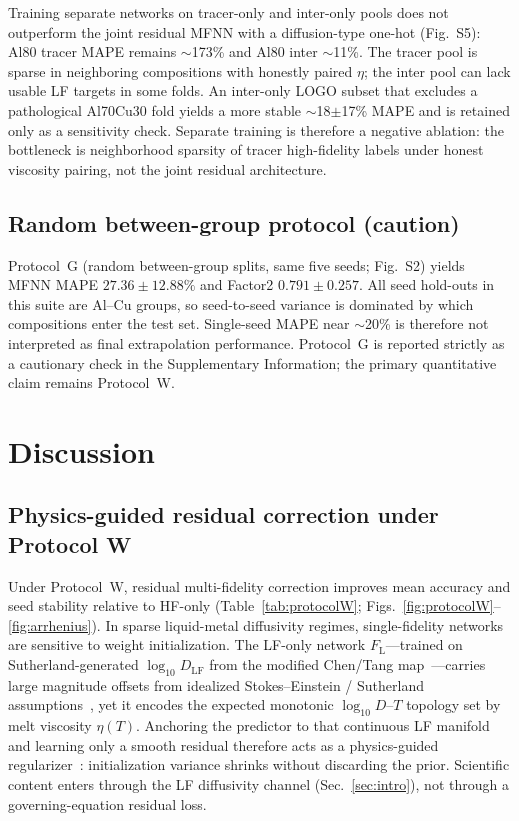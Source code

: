 \documentclass[review,12pt]{elsarticle}
\begin{document}
Training separate networks on tracer-only and inter-only pools does not outperform the joint residual MFNN with a diffusion-type one-hot (Fig.~S5): Al80 tracer MAPE remains $\sim$173\% and Al80 inter $\sim$11\%. The tracer pool is sparse in neighboring compositions with honestly paired $\eta$; the inter pool can lack usable LF targets in some folds. An inter-only LOGO subset that excludes a pathological Al70Cu30 fold yields a more stable $\sim$18$\pm$17\% MAPE and is retained only as a sensitivity check. Separate training is therefore a negative ablation: the bottleneck is neighborhood sparsity of tracer high-fidelity labels under honest viscosity pairing, not the joint residual architecture.


\subsection{Random between-group protocol (caution)}
\label{sec:protocolG}

Protocol~G (random between-group splits, same five seeds; Fig.~S2) yields MFNN MAPE $27.36\pm 12.88\%$ and Factor2 $0.791\pm 0.257$. All seed hold-outs in this suite are Al--Cu groups, so seed-to-seed variance is dominated by which compositions enter the test set. Single-seed MAPE near $\sim$20\% is therefore not interpreted as final extrapolation performance. Protocol~G is reported strictly as a cautionary check in the Supplementary Information; the primary quantitative claim remains Protocol~W.




\section{Discussion}
\label{sec:discussion}

\subsection{Physics-guided residual correction under Protocol W}

Under Protocol~W, residual multi-fidelity correction improves mean accuracy and seed stability relative to HF-only (Table~\ref{tab:protocolW}; Figs.~\ref{fig:protocolW}--\ref{fig:arrhenius}). In sparse liquid-metal diffusivity regimes, single-fidelity networks are sensitive to weight initialization. The LF-only network $F_{\mathrm{L}}$---trained on Sutherland-generated $\log_{10} D_{\mathrm{LF}}$ from the modified Chen/Tang map~\cite{chen2014,tang2015}---carries large magnitude offsets from idealized Stokes--Einstein / Sutherland assumptions~\cite{sutherland1905,demmel2018}, yet it encodes the expected monotonic $\log_{10} D$--$T$ topology set by melt viscosity $\eta(T)$. Anchoring the predictor to that continuous LF manifold and learning only a smooth residual therefore acts as a physics-guided regularizer~\cite{willard2022,lu2020pnas,meng2020jcp,peherstorfer2018}: initialization variance shrinks without discarding the prior. Scientific content enters through the LF diffusivity channel (Sec.~\ref{sec:intro}), not through a governing-equation residual loss.
\end{document}
